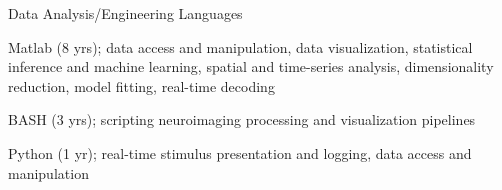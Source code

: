 \vspace*{-0.25cm}

\vspace*{0.3cm}

\begin{cventries}

\cventry
    {Data Analysis/Engineering} %
    {Languages} %
    {\vspace*{-0.05cm}}
    {\vspace*{-0.05cm}} %
    {
      \begin{cvitems} %
        \item {Matlab (8 yrs); data access and manipulation, data visualization, statistical inference and machine learning, spatial and time-series analysis, dimensionality reduction, model fitting, real-time decoding}
        \item {BASH (3 yrs); scripting neuroimaging processing and visualization pipelines}
        \item {Python (1 yr); real-time stimulus presentation and logging, data access and manipulation}
      \end{cvitems}
    }
    \vspace*{0.1cm}


\end{cventries}
